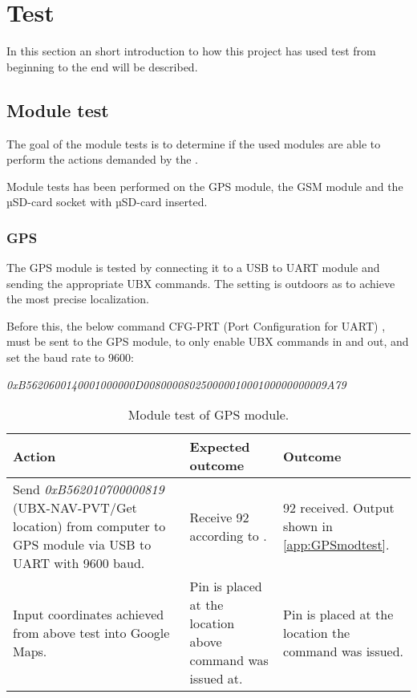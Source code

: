 
\chapter{Test}
In this section an short introduction to how this project has used test from beginning to the end will be described.

\section{Module test}
The goal of the module tests is to determine if the used modules are able to perform the actions demanded by the .

Module tests has been performed on the \GPS GPS module, the \SARA GSM module and the \SDsock µSD-card socket with µSD-card inserted.

\subsection{GPS \GPS}
The GPS module is tested by connecting it to a USB to UART module and sending the appropriate UBX commands. The setting is outdoors as to achieve the most precise localization.

Before this, the below command CFG-PRT (Port Configuration for UART) \cite[p.~119-120]{NEO7_proto}, must be sent to the GPS module, to only enable UBX commands in and out, and set the baud rate to \num{9600}:

\noindent
\textit{0xB5620600140001000000D00800008025000001000100000000009A79}

\begin{table}[H]
	\centering
	\begin{tabularx}{\textwidth}{p{4.3cm} X X}
		\toprule
		\textbf{Action} & \textbf{Expected outcome} & \textbf{Outcome} \\
		\midrule
		Send \textit{0xB562010700000819} (UBX-NAV-PVT/Get location) from computer to GPS module via USB to UART with \num{9600} baud. & Receive \SI{92}{\byte} according to \cite[p.~160-161]{NEO7_proto}. & \SI{92}{\byte} received. Output shown in \cref{app:GPSmodtest}. \\
		\midrule
		Input coordinates achieved from above test into Google Maps. & Pin is placed at the location above command was issued at. & Pin is placed at the location the command was issued. \\
		\bottomrule
	\end{tabularx}
	\caption{Module test of \GPS GPS module.}
	\label{AT:modGPS}
\end{table}

